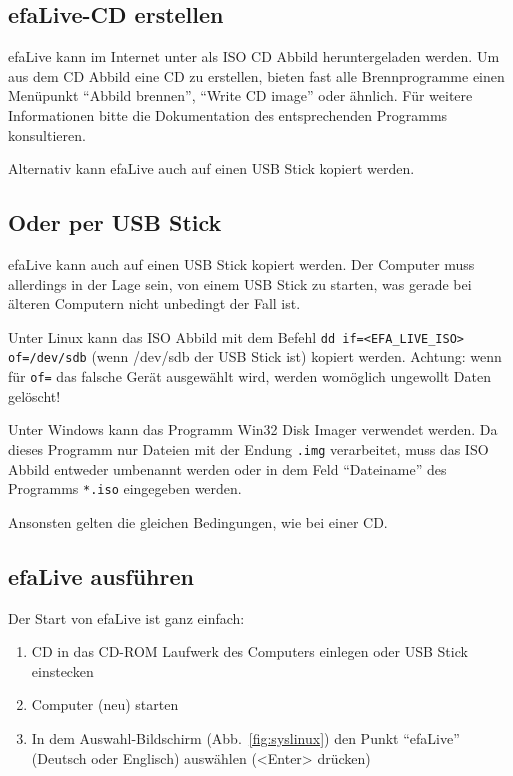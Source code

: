 \documentclass[a4paper,12pt,twoside]{article}
\begin{document}
\subsection{efaLive-CD erstellen}
\label{sct:cd_erstellen}
efaLive kann im Internet unter \cite{EFA4} als ISO CD Abbild
heruntergeladen werden. Um aus dem CD Abbild eine CD zu erstellen,
bieten fast alle Brennprogramme einen Menüpunkt "`Abbild brennen"', 
"`Write CD image"' oder ähnlich. Für weitere Informationen bitte 
die Dokumentation des entsprechenden Programms konsultieren. 

Alternativ kann efaLive auch auf einen USB Stick kopiert werden.


\subsection{Oder per USB Stick}
\label{sct:usb_stick}
efaLive kann auch auf einen USB Stick kopiert werden.
Der Computer muss allerdings in der Lage sein, von einem USB Stick zu
starten, was gerade bei älteren Computern nicht unbedingt der Fall ist.

Unter Linux kann das ISO Abbild mit dem Befehl \texttt{dd if={\textless}EFA\_LIVE\_ISO{\textgreater} 
of=/dev/sdb} (wenn /dev/sdb der USB Stick ist) kopiert werden. Achtung: 
wenn für \texttt{of=} das falsche Gerät ausgewählt wird, werden womöglich 
ungewollt Daten gelöscht!

Unter Windows kann das Programm Win32 Disk Imager \cite{IMG1} verwendet
werden. Da dieses Programm nur Dateien mit der Endung \texttt{.img} 
verarbeitet, muss das ISO Abbild entweder umbenannt werden oder in dem 
Feld "`Dateiname"' des Programms \texttt{*.iso} eingegeben werden.

Ansonsten gelten die gleichen Bedingungen, wie bei einer CD.


\subsection{efaLive ausführen}
\label{sct:live_ausfuehren}
Der Start von efaLive ist ganz einfach:

\begin{enumerate}
    \item CD in das CD-ROM Laufwerk des Computers einlegen oder USB Stick
        einstecken
    \item Computer (neu) starten
    \item In dem Auswahl-Bildschirm (Abb.~\ref{fig:syslinux}) den Punkt
        "`efaLive"' (Deutsch oder Englisch) auswählen ({\textless}Enter{\textgreater} 
        drücken)
\end{enumerate}
\end{document}
